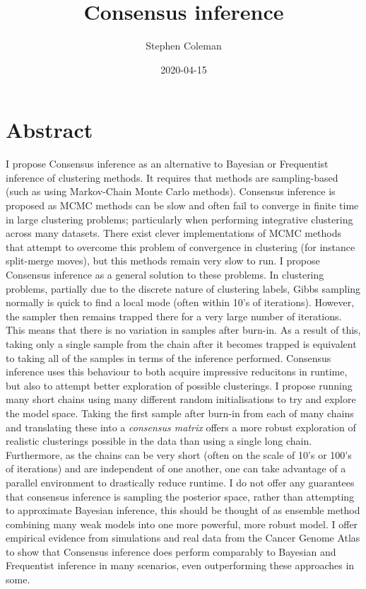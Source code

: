 \documentclass[
]{book}
\title{Consensus inference}
\author{Stephen Coleman}
\date{2020-04-15}
\begin{document}
\maketitle

{
\setcounter{tocdepth}{1}
\tableofcontents
}
\hypertarget{abstract}{%
\chapter*{Abstract}\label{abstract}}

I propose Consensus inference as an alternative to Bayesian or Frequentist inference of clustering methods. It requires that methods are sampling-based (such as using Markov-Chain Monte Carlo methods). Consensus inference is proposed as MCMC methods can be slow and often fail to converge in finite time in large clustering problems; particularly when performing integrative clustering across many datasets. There exist clever implementations of MCMC methods that attempt to overcome this problem of convergence in clustering (for instance split-merge moves), but this methods remain very slow to run. I propose Consensus inference as a general solution to these problems. In clustering problems, partially due to the discrete nature of clustering labels, Gibbs sampling normally is quick to find a local mode (often within 10's of iterations). However, the sampler then remains trapped there for a very large number of iterations. This means that there is no variation in samples after burn-in. As a result of this, taking only a single sample from the chain after it becomes trapped is equivalent to taking all of the samples in terms of the inference performed. Consensus inference uses this behaviour to both acquire impressive reducitons in runtime, but also to attempt better exploration of possible clusterings. I propose running many short chains using many different random initialisations to try and explore the model space. Taking the first sample after burn-in from each of many chains and translating these into a \emph{consensus matrix} offers a more robust exploration of realistic clusterings possible in the data than using a single long chain. Furthermore, as the chains can be very short (often on the scale of 10's or 100's of iterations) and are independent of one another, one can take advantage of a parallel environment to drastically reduce runtime. I do not offer any guarantees that consensus inference is sampling the posterior space, rather than attempting to approximate Bayesian inference, this should be thought of as ensemble method combining many weak models into one more powerful, more robust model. I offer empirical evidence from simulations and real data from the Cancer Genome Atlas to show that Consensus inference does perform comparably to Bayesian and Frequentist inference in many scenarios, even outperforming these approaches in some.
\end{document}
